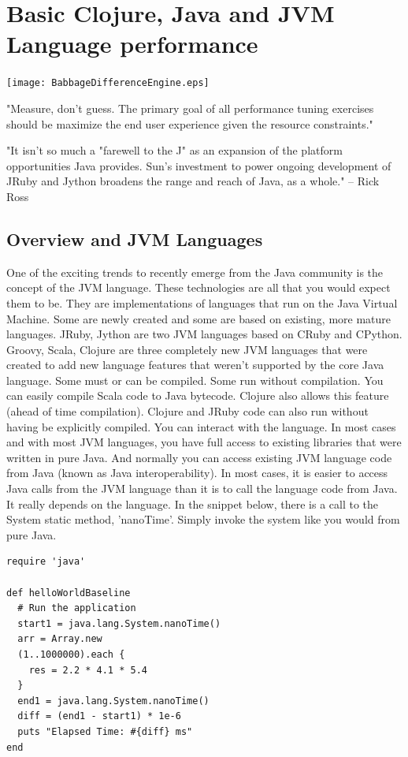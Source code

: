 \section{Basic Clojure, Java and JVM Language performance}

\texttt{[image: BabbageDifferenceEngine.eps]}

"Measure, don't guess. The primary goal of all performance tuning exercises should be maximize the end user experience given the resource constraints."

"It isn't so much a "farewell to the J" as an expansion of the platform opportunities Java provides. Sun's investment to power ongoing development of JRuby and Jython broadens the range and reach of Java, as a whole." -- Rick Ross

\subsection{Overview and JVM Languages}

One of the exciting trends to recently emerge from the Java community is the concept of the JVM language. These technologies are all that you would expect them to be. They are implementations of languages that run on the Java Virtual Machine. Some are newly created and some are based on existing, more mature languages. JRuby, Jython are two JVM languages based on CRuby and CPython. Groovy, Scala, Clojure are three completely new JVM languages that were created to add new language features that weren't supported by the core Java language. Some must or can be compiled. Some run without compilation. You can easily compile Scala code to Java bytecode. Clojure also allows this feature (ahead of time compilation). Clojure and JRuby code can also run without having be explicitly compiled. You can interact with the language. In most cases and with most JVM languages, you have full access to existing libraries that were written in pure Java. And normally you can access existing JVM language code from Java (known as Java interoperability). In most cases, it is easier to access Java calls from the JVM language than it is to call the language code from Java. It really depends on the language. In the snippet below, there is a call to the System static method, 'nanoTime'. Simply invoke the system like you would from pure Java.

\begin{verbatim}
require 'java'

def helloWorldBaseline
  # Run the application
  start1 = java.lang.System.nanoTime()
  arr = Array.new
  (1..1000000).each {
    res = 2.2 * 4.1 * 5.4
  }
  end1 = java.lang.System.nanoTime()
  diff = (end1 - start1) * 1e-6  
  puts "Elapsed Time: #{diff} ms"
end
\end{verbatim}

